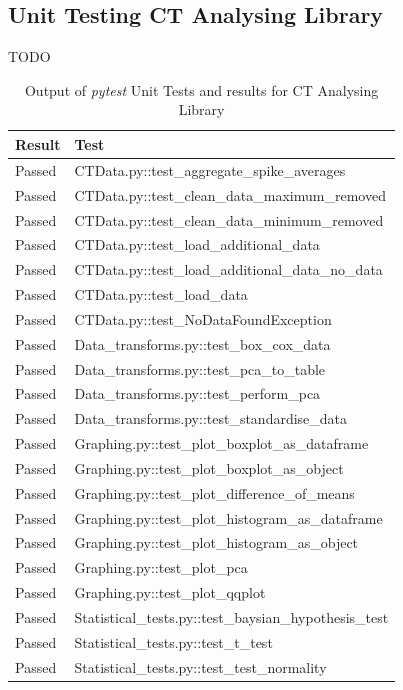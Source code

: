 \documentclass[11pt]{report}
\begin{document}
\subsection{Unit Testing CT Analysing Library}
\label{sec:org721f763}
TODO
\begin{table}[htbp]
\caption{\label{tab:org81bc5c0}
Output of \emph{pytest} Unit Tests and results for CT Analysing Library}
\centering
\begin{tabularx}{\textwidth}{|l|X|}
\hline
\textbf{Result} & \textbf{Test}\\
\hline
\color{ForestGreen}Passed & CTData.py::test\_aggregate\_spike\_averages\\
\hline
\color{ForestGreen}Passed & CTData.py::test\_clean\_data\_maximum\_removed\\
\hline
\color{ForestGreen}Passed & CTData.py::test\_clean\_data\_minimum\_removed\\
\hline
\color{ForestGreen}Passed & CTData.py::test\_load\_additional\_data\\
\hline
\color{ForestGreen}Passed & CTData.py::test\_load\_additional\_data\_no\_data\\
\hline
\color{ForestGreen}Passed & CTData.py::test\_load\_data\\
\hline
\color{ForestGreen}Passed & CTData.py::test\_NoDataFoundException\\
\hline
\color{ForestGreen}Passed & Data\_transforms.py::test\_box\_cox\_data\\
\hline
\color{ForestGreen}Passed & Data\_transforms.py::test\_pca\_to\_table\\
\hline
\color{ForestGreen}Passed & Data\_transforms.py::test\_perform\_pca\\
\hline
\color{ForestGreen}Passed & Data\_transforms.py::test\_standardise\_data\\
\hline
\color{ForestGreen}Passed & Graphing.py::test\_plot\_boxplot\_as\_dataframe\\
\hline
\color{ForestGreen}Passed & Graphing.py::test\_plot\_boxplot\_as\_object\\
\hline
\color{ForestGreen}Passed & Graphing.py::test\_plot\_difference\_of\_means\\
\hline
\color{ForestGreen}Passed & Graphing.py::test\_plot\_histogram\_as\_dataframe\\
\hline
\color{ForestGreen}Passed & Graphing.py::test\_plot\_histogram\_as\_object\\
\hline
\color{ForestGreen}Passed & Graphing.py::test\_plot\_pca\\
\hline
\color{ForestGreen}Passed & Graphing.py::test\_plot\_qqplot\\
\hline
\color{ForestGreen}Passed & Statistical\_tests.py::test\_baysian\_hypothesis\_test\\
\hline
\color{ForestGreen}Passed & Statistical\_tests.py::test\_t\_test\\
\hline
\color{ForestGreen}Passed & Statistical\_tests.py::test\_test\_normality\\
\hline
\end{tabularx}
\end{table}
\end{document}
